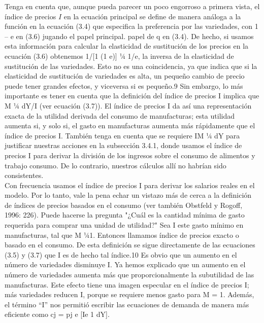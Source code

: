 Tenga en cuenta que, aunque pueda parecer un poco engorroso a primera vista, el índice de precios $I$ en la ecuación principal se define de manera análoga a la función en la ecuación (3.4) que especifica la preferencia por las variedades, con 1 – e en (3.6) jugando el papel principal. papel de q en (3.4). De hecho, si usamos esta información para calcular la elasticidad de sustitución de los precios en la ecuación (3.6) obtenemos 1/[1 (1 e)] ¼ 1/e, la inversa de la elasticidad de sustitución de las variedades. Esto no es una coincidencia, ya que indica que si la elasticidad de sustitución de variedades es alta, un pequeño cambio de precio puede tener grandes efectos, y viceversa si es pequeño.9 Sin embargo, lo más importante es tener en cuenta que la definición del índice de precios I implica que M ¼ dY/I (ver ecuación (3.7)). El índice de precios I da así una representación exacta de la utilidad derivada del consumo de manufacturas; esta utilidad aumenta si, y solo si, el gasto en manufacturas aumenta más rápidamente que el índice de precios I. También tenga en cuenta que se requiere IM ¼ dY para justificar nuestras acciones en la subsección 3.4.1, donde usamos el índice de precios I para derivar la división de los ingresos sobre el consumo de alimentos y trabajo consumo. De lo contrario, nuestros cálculos allí no habrían sido consistentes.\\
Con frecuencia usamos el índice de precios I para derivar los salarios reales en el modelo. Por lo tanto, vale la pena echar un vistazo más de cerca a la definición de índices de precios basados en el consumo (ver también Obstfeld y Rogoff, 1996: 226). Puede hacerse la pregunta "¿Cuál es la cantidad mínima de gasto requerida para comprar una unidad de utilidad?" Sea I este gasto mínimo en manufacturas, tal que M ¼1. Entonces llamamos índice de precios exacto o basado en el consumo. De esta definición se sigue directamente de las ecuaciones (3.5) y (3.7) que I es de hecho tal índice.10 Es obvio que un aumento en el número de variedades disminuye I. Ya hemos explicado que un aumento en el número de variedades aumenta más que proporcionalmente la subutilidad de las manufacturas. Este efecto tiene una imagen especular en el índice de precios I; más variedades reducen I, porque se requiere menos gasto para M = 1. Además, el término “I” nos permitió escribir las ecuaciones de demanda de manera más eficiente como cj = pj e [Ie 1 dY].\\
